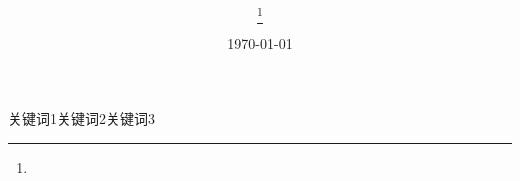 \documentclass[UTF8]{ctexart}
\title{\bfseries }
\author{ \thanks{ }} %
\date{\today}        %
\begin{document}
\maketitle


\begin{center}
\parbox{130mm}{
\par
\vspace{1mm}
关键词1\quad 关键词2\quad 关键词3}
\end{center}



\renewcommand{\refname}{参考文献}

\end{document}
